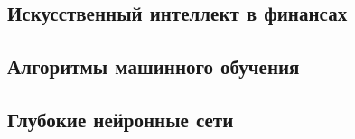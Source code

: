 \subsection{Искусственный интеллект в финансах}


\subsection{Алгоритмы машинного обучения}
\label{sec:ml_algos}


\subsection{Глубокие нейронные сети}
\label{sec:models}
